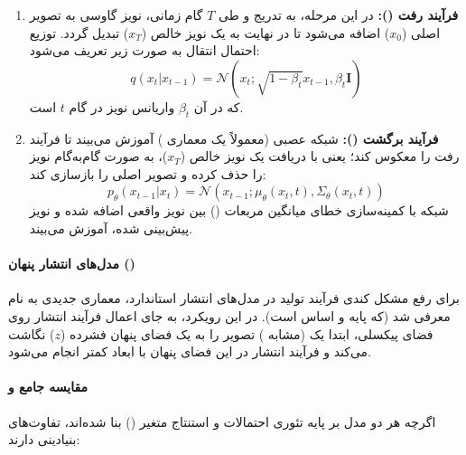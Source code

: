 \documentclass{article}
\begin{document}
\begin{enumerate}
	\item \textbf{فرآیند رفت ():} در این مرحله، به تدریج و طی $T$ گام زمانی، نویز گاوسی به تصویر اصلی ($x_0$) اضافه می‌شود تا در نهایت به یک نویز خالص ($x_T$) تبدیل گردد. توزیع احتمال انتقال به صورت زیر تعریف می‌شود:
	\[ q(x_t | x_{t-1}) = \mathcal{N}(x_t; \sqrt{1 - \beta_t} x_{t-1}, \beta_t \mathbf{I}) \]
	که در آن $\beta_t$ واریانس نویز در گام $t$ است.
	
	\item \textbf{فرآیند برگشت ():} شبکه عصبی (معمولاً یک معماری ) آموزش می‌بیند تا فرآیند رفت را معکوس کند؛ یعنی با دریافت یک نویز خالص ($x_T$)، به صورت گام‌به‌گام نویز را حذف کرده و تصویر اصلی را بازسازی کند:
	\[ p_\theta(x_{t-1} | x_t) = \mathcal{N}(x_{t-1}; \mu_\theta(x_t, t), \Sigma_\theta(x_t, t)) \]
	شبکه با کمینه‌سازی خطای میانگین مربعات () بین نویز واقعی اضافه شده و نویز پیش‌بینی شده، آموزش می‌بیند.
\end{enumerate}

\paragraph{مدل‌های انتشار پنهان ()}
برای رفع مشکل کندی فرآیند تولید در مدل‌های انتشار استاندارد، معماری جدیدی به نام  معرفی شد (که پایه و اساس  است). در این رویکرد، به جای اعمال فرآیند انتشار روی فضای پیکسلی، ابتدا یک  (مشابه ) تصویر را به یک فضای پنهان فشرده ($z$) نگاشت می‌کند و فرآیند انتشار در این فضای پنهان با ابعاد کمتر انجام می‌شود.

\paragraph{مقایسه جامع  و }
اگرچه هر دو مدل بر پایه تئوری احتمالات و استنتاج متغیر () بنا شده‌اند، تفاوت‌های بنیادینی دارند:
\end{document}
